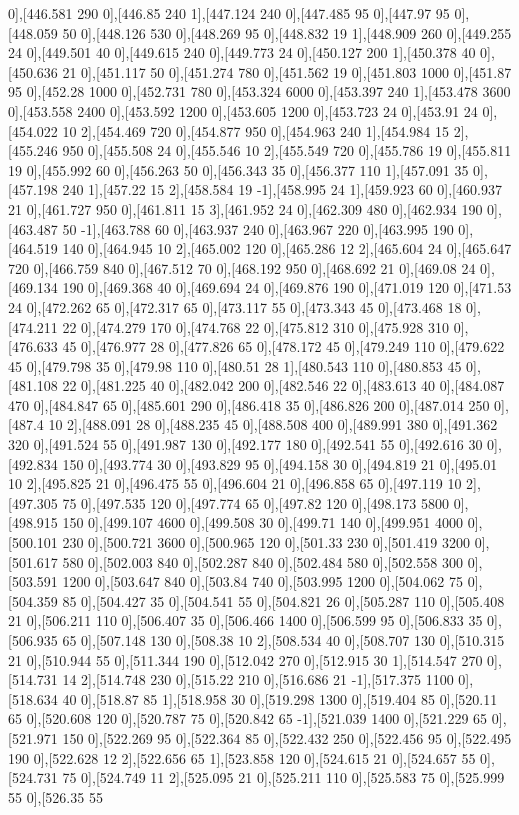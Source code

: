 {0],[446.581 290 0],[446.85 240 1],[447.124 240 0],[447.485 95 0],[447.97 95 0],[448.059 50 0],[448.126 530 0],[448.269 95 0],[448.832 19 1],[448.909 260 0],[449.255 24 0],[449.501 40 0],[449.615 240 0],[449.773 24 0],[450.127 200 1],[450.378 40 0],[450.636 21 0],[451.117 50 0],[451.274 780 0],[451.562 19 0],[451.803 1000 0],[451.87 95 0],[452.28 1000 0],[452.731 780 0],[453.324 6000 0],[453.397 240 1],[453.478 3600 0],[453.558 2400 0],[453.592 1200 0],[453.605 1200 0],[453.723 24 0],[453.91 24 0],[454.022 10 2],[454.469 720 0],[454.877 950 0],[454.963 240 1],[454.984 15 2],[455.246 950 0],[455.508 24 0],[455.546 10 2],[455.549 720 0],[455.786 19 0],[455.811 19 0],[455.992 60 0],[456.263 50 0],[456.343 35 0],[456.377 110 1],[457.091 35 0],[457.198 240 1],[457.22 15 2],[458.584 19 -1],[458.995 24 1],[459.923 60 0],[460.937 21 0],[461.727 950 0],[461.811 15 3],[461.952 24 0],[462.309 480 0],[462.934 190 0],[463.487 50 -1],[463.788 60 0],[463.937 240 0],[463.967 220 0],[463.995 190 0],[464.519 140 0],[464.945 10 2],[465.002 120 0],[465.286 12 2],[465.604 24 0],[465.647 720 0],[466.759 840 0],[467.512 70 0],[468.192 950 0],[468.692 21 0],[469.08 24 0],[469.134 190 0],[469.368 40 0],[469.694 24 0],[469.876 190 0],[471.019 120 0],[471.53 24 0],[472.262 65 0],[472.317 65 0],[473.117 55 0],[473.343 45 0],[473.468 18 0],[474.211 22 0],[474.279 170 0],[474.768 22 0],[475.812 310 0],[475.928 310 0],[476.633 45 0],[476.977 28 0],[477.826 65 0],[478.172 45 0],[479.249 110 0],[479.622 45 0],[479.798 35 0],[479.98 110 0],[480.51 28 1],[480.543 110 0],[480.853 45 0],[481.108 22 0],[481.225 40 0],[482.042 200 0],[482.546 22 0],[483.613 40 0],[484.087 470 0],[484.847 65 0],[485.601 290 0],[486.418 35 0],[486.826 200 0],[487.014 250 0],[487.4 10 2],[488.091 28 0],[488.235 45 0],[488.508 400 0],[489.991 380 0],[491.362 320 0],[491.524 55 0],[491.987 130 0],[492.177 180 0],[492.541 55 0],[492.616 30 0],[492.834 150 0],[493.774 30 0],[493.829 95 0],[494.158 30 0],[494.819 21 0],[495.01 10 2],[495.825 21 0],[496.475 55 0],[496.604 21 0],[496.858 65 0],[497.119 10 2],[497.305 75 0],[497.535 120 0],[497.774 65 0],[497.82 120 0],[498.173 5800 0],[498.915 150 0],[499.107 4600 0],[499.508 30 0],[499.71 140 0],[499.951 4000 0],[500.101 230 0],[500.721 3600 0],[500.965 120 0],[501.33 230 0],[501.419 3200 0],[501.617 580 0],[502.003 840 0],[502.287 840 0],[502.484 580 0],[502.558 300 0],[503.591 1200 0],[503.647 840 0],[503.84 740 0],[503.995 1200 0],[504.062 75 0],[504.359 85 0],[504.427 35 0],[504.541 55 0],[504.821 26 0],[505.287 110 0],[505.408 21 0],[506.211 110 0],[506.407 35 0],[506.466 1400 0],[506.599 95 0],[506.833 35 0],[506.935 65 0],[507.148 130 0],[508.38 10 2],[508.534 40 0],[508.707 130 0],[510.315 21 0],[510.944 55 0],[511.344 190 0],[512.042 270 0],[512.915 30 1],[514.547 270 0],[514.731 14 2],[514.748 230 0],[515.22 210 0],[516.686 21 -1],[517.375 1100 0],[518.634 40 0],[518.87 85 1],[518.958 30 0],[519.298 1300 0],[519.404 85 0],[520.11 65 0],[520.608 120 0],[520.787 75 0],[520.842 65 -1],[521.039 1400 0],[521.229 65 0],[521.971 150 0],[522.269 95 0],[522.364 85 0],[522.432 250 0],[522.456 95 0],[522.495 190 0],[522.628 12 2],[522.656 65 1],[523.858 120 0],[524.615 21 0],[524.657 55 0],[524.731 75 0],[524.749 11 2],[525.095 21 0],[525.211 110 0],[525.583 75 0],[525.999 55 0],[526.35 55 }
